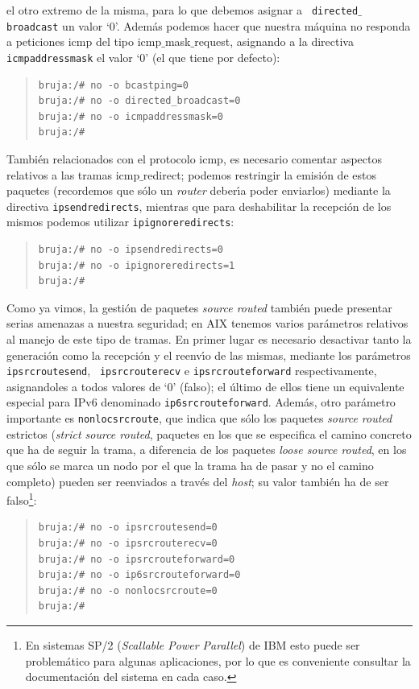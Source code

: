 el otro extremo de la misma, para lo que debemos asignar a {\tt 
directed$\_$broadcast} un valor `0'. Adem\'as podemos hacer que nuestra 
m\'aquina no responda a peticiones {\sc icmp} del tipo {\sc 
icmp$\_$mask$\_$request}, asignando a la directiva {\tt icmpaddressmask} el 
valor `0' (el que tiene por defecto):
\begin{quote}
\begin{verbatim}
bruja:/# no -o bcastping=0
bruja:/# no -o directed_broadcast=0
bruja:/# no -o icmpaddressmask=0
bruja:/#
\end{verbatim}
\end{quote}
Tambi\'en relacionados con el protocolo {\sc icmp}, es necesario comentar 
aspectos relativos a las tramas {\sc icmp$\_$redirect}; podemos restringir la 
emisi\'on de estos paquetes (recordemos que s\'olo un {\it router} deber\'{\i}a
poder enviarlos) mediante la directiva {\tt ipsendredirects}, 
mientras que para deshabilitar la recepci\'on de los mismos podemos utilizar 
{\tt ipignoreredirects}:
\begin{quote}
\begin{verbatim}
bruja:/# no -o ipsendredirects=0
bruja:/# no -o ipignoreredirects=1
bruja:/#
\end{verbatim}
\end{quote}
Como ya vimos, la gesti\'on de paquetes {\it source routed} tambi\'en puede
presentar serias amenazas a nuestra seguridad; en AIX tenemos varios 
par\'ametros relativos al manejo de este tipo de tramas. En primer lugar es
necesario desactivar tanto la generaci\'on como la recepci\'on y el reenv\'{\i}o
de las mismas, mediante los par\'ametros {\tt ipsrcroutesend}, {\tt 
ipsrcrouterecv} e {\tt ipsrcrouteforward} respectivamente, asignandoles a todos 
valores de `0' (falso); el \'ultimo de ellos tiene un equivalente especial para
IPv6 denominado {\tt ip6srcrouteforward}. Adem\'as, 
otro par\'ametro importante es {\tt nonlocsrcroute}, que indica que s\'olo los 
paquetes {\it source routed} estrictos ({\it strict source routed}, paquetes en 
los que se especifica el camino concreto que ha de seguir la trama, a 
diferencia de los paquetes {\it loose source routed}, en los que s\'olo se
marca un nodo por el que la trama ha de pasar y no el camino completo) pueden 
ser reenviados a trav\'es del {\it 
host}; su valor tambi\'en ha de ser falso\footnote{En sistemas {\sc SP/2}
({\it Scallable Power Parallel}) de IBM esto puede ser problem\'atico para 
algunas aplicaciones, por lo que es conveniente consultar la documentaci\'on
del sistema en cada caso.}:
\begin{quote}
\begin{verbatim}
bruja:/# no -o ipsrcroutesend=0
bruja:/# no -o ipsrcrouterecv=0
bruja:/# no -o ipsrcrouteforward=0
bruja:/# no -o ip6srcrouteforward=0
bruja:/# no -o nonlocsrcroute=0
bruja:/#
\end{verbatim}
\end{quote}
